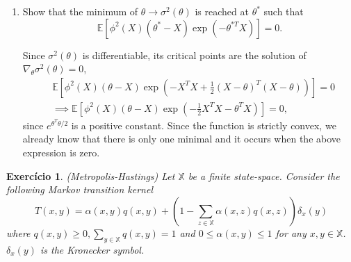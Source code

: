 \documentclass[a4paper,12pt]{article}
\newcommand{\ev}{\mathbb{E}}
\newtheorem{exercise}{Exercício}
\theoremstyle{definition}
\begin{document}
\begin{enumerate}
    \item Show that the minimum of $\theta \to \sigma^2(\theta)$ is 
    reached at $\theta^{*}$ such that
    $$
    \ev[\phi^2(X)(\theta^* - X)\exp(-\theta^{*T}X)] = 0.
    $$

    Since $\sigma^2(\theta)$ is differentiable, its critical points are 
    the solution of $\nabla_\theta \sigma^2(\theta) = 0$, 
    \begin{equation*}
        \begin{split}
            &\ev\left[\phi^2(X)(\theta-X)\exp\left(-X^TX +
        \frac{1}{2}(X-\theta)^T(X-\theta)\right)\right] = 0 \\
        &\implies \ev\left[\phi^2(X)(\theta-X)\exp\left(-\frac{1}{2}X^TX
        -\theta^TX\right)\right] = 0, 
        \end{split}
    \end{equation*}  
    since $e^{\theta^T\theta/2}$ is a positive constant. Since the function 
    is strictly convex, we already know that there is only one minimal 
    and it occurs when the above expression is zero. 
\end{enumerate}

\begin{exercise}
    (Metropolis-Hastings)
    Let $\mathbb{X}$ be a finite state-space. Consider the following Markov
    transition kernel
    $$T(x, y) = \alpha(x, y)q(x, y) + \left(1 - \sum_{z \in \mathbb{X}}
    \alpha(x, z) q(x, z)\right) \delta_x(y)$$
    where $q(x, y) \ge 0, \sum_{y \in \mathbb{X}} q (x, y) = 1$ and $0 \le\alpha (x, y) \le 1$ for any $x, y \in \mathbb{X}$. $\delta_x(y)$ is the Kronecker symbol.    
\end{exercise}
\end{document}
